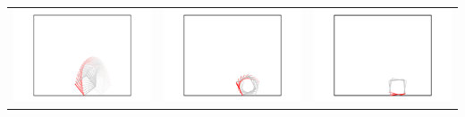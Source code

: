 \documentclass[11pt]{article}
\begin{document}
\begin{center}
\begin{tabular}{ccc}
\includegraphics[scale = 0.26]{simA_04.pdf} & \includegraphics[scale = 0.26]{simB_04.pdf} & \includegraphics[scale = 0.26]{simC_04.pdf} \\

\end{tabular}
\end{center}
\end{document}
